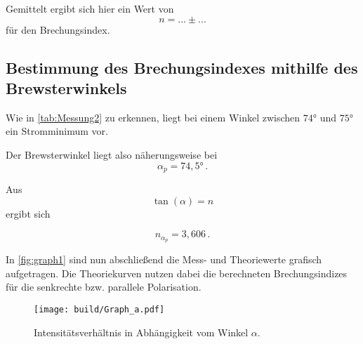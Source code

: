 Gemittelt ergibt sich hier ein Wert von
\begin{equation*}
    n = ... \pm ...
\end{equation*}
für den Brechungsindex.

\subsection{Bestimmung des Brechungsindexes mithilfe des Brewsterwinkels}

Wie in \autoref{tab:Messung2} zu erkennen, liegt bei einem Winkel zwischen $74°$ und $75°$ ein Stromminimum vor.

Der Brewsterwinkel liegt also näherungsweise bei
\begin{equation*}
    \alpha_p = 74,5 ° \,.
\end{equation*}

Aus
\begin{equation*}
    \tan(\alpha) = n 
\end{equation*}
ergibt sich

\begin{equation*}
    n_{\alpha_p} = 3,606 \,.
\end{equation*}

In \autoref{fig:graph1} sind nun abschließend die Mess- und Theoriewerte grafisch aufgetragen. Die Theoriekurven nutzen dabei die berechneten Brechungsindizes für die senkrechte bzw. parallele Polarisation.

\begin{figure}
    \centering
    \texttt{[image: build/Graph\_a.pdf]}
    \caption{Intensitätsverhältnis in Abhängigkeit vom Winkel $\alpha$.}
    \label{fig:graph1}
\end{figure}
